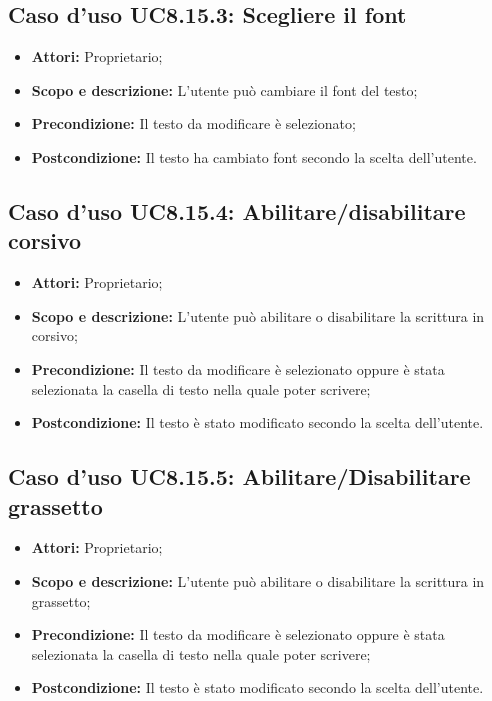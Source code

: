 \subsection{Caso d'uso UC8.15.3: Scegliere il font}
\begin{itemize}
	\item \textbf{Attori:} Proprietario;
	\item \textbf{Scopo e descrizione:} L'utente può cambiare il font del testo;
	\item \textbf{Precondizione:} Il testo da modificare è selezionato;
	\item \textbf{Postcondizione:} Il testo ha cambiato font secondo la scelta dell'utente.
\end{itemize}

\subsection{Caso d'uso UC8.15.4: Abilitare/disabilitare corsivo}
\begin{itemize}
	\item \textbf{Attori:} Proprietario;
	\item \textbf{Scopo e descrizione:} L'utente può abilitare o disabilitare la scrittura in corsivo;
	\item \textbf{Precondizione:} Il testo da modificare è selezionato oppure è stata selezionata la casella di testo nella quale poter scrivere;
	\item \textbf{Postcondizione:} Il testo è stato modificato secondo la scelta dell'utente.
\end{itemize}

\subsection{Caso d'uso UC8.15.5: Abilitare/Disabilitare grassetto}
\begin{itemize}
	\item \textbf{Attori:} Proprietario;
	\item \textbf{Scopo e descrizione:} L'utente può abilitare o disabilitare la scrittura in grassetto;
	\item \textbf{Precondizione:} Il testo da modificare è selezionato oppure è stata selezionata la casella di testo nella quale poter scrivere;
	\item \textbf{Postcondizione:} Il testo è stato modificato secondo la scelta dell'utente.
\end{itemize}


